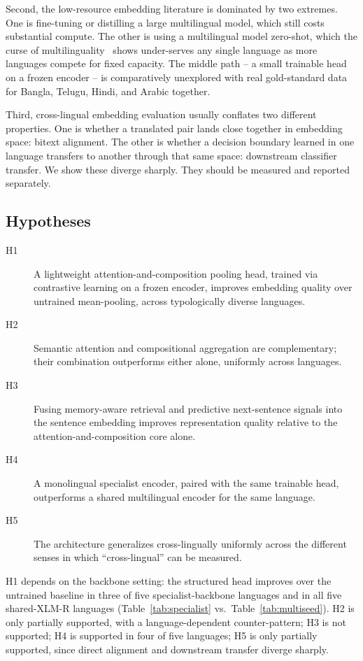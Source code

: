 \documentclass[manuscript]{acmart}
\begin{document}
Second, the low-resource embedding literature is dominated by two extremes. One is fine-tuning or distilling a large multilingual model, which still costs substantial compute. The other is using a multilingual model zero-shot, which the curse of multilinguality~\citep{conneau2020xlmr} shows under-serves any single language as more languages compete for fixed capacity. The middle path -- a small trainable head on a frozen encoder -- is comparatively unexplored with real gold-standard data for Bangla, Telugu, Hindi, and Arabic together.

Third, cross-lingual embedding evaluation usually conflates two different properties. One is whether a translated pair lands close together in embedding space: bitext alignment. The other is whether a decision boundary learned in one language transfers to another through that same space: downstream classifier transfer. We show these diverge sharply. They should be measured and reported separately.

\subsection{Hypotheses}
\label{sec:hypotheses}

\begin{description}
\item[H1] A lightweight attention-and-composition pooling head, trained via contrastive learning on a frozen encoder, improves embedding quality over untrained mean-pooling, across typologically diverse languages.
\item[H2] Semantic attention and compositional aggregation are complementary; their combination outperforms either alone, uniformly across languages.
\item[H3] Fusing memory-aware retrieval and predictive next-sentence signals into the sentence embedding improves representation quality relative to the attention-and-composition core alone.
\item[H4] A monolingual specialist encoder, paired with the same trainable head, outperforms a shared multilingual encoder for the same language.
\item[H5] The architecture generalizes cross-lingually uniformly across the different senses in which ``cross-lingual'' can be measured.
\end{description}

H1 depends on the backbone setting: the structured head improves over the untrained baseline in three of five specialist-backbone languages and in all five shared-XLM-R languages (Table~\ref{tab:specialist} vs.\ Table~\ref{tab:multiseed}). H2 is only partially supported, with a language-dependent counter-pattern; H3 is not supported; H4 is supported in four of five languages; H5 is only partially supported, since direct alignment and downstream transfer diverge sharply.
\end{document}
